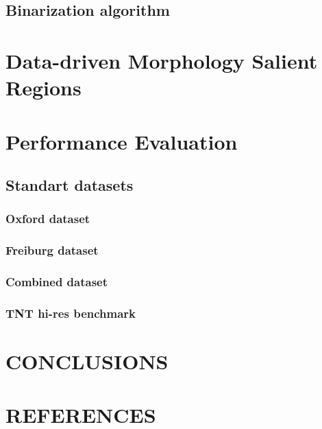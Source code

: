 \documentclass{article}
\begin{document}
\subsection{Binarization algorithm}
\label{ssec:binarize}


\section{Data-driven Morphology Salient Regions}
\label{sec:DMSR}


\section{Performance  Evaluation}
\label{sec:perf}

\subsection{Standart datasets}
\label{ssec:standart}

\subsubsection{Oxford dataset}
\label{sssec:oxford}
\subsubsection{Freiburg dataset}
\label{sssec:freiburg}
\subsubsection{Combined dataset}
\label{sssec:combined}
\subsubsection{TNT hi-res benchmark}
\label{sssec:tnt}

\section{CONCLUSIONS}
\label{sec:concl}






\section{REFERENCES}
\label{sec:ref}




\end{document}
